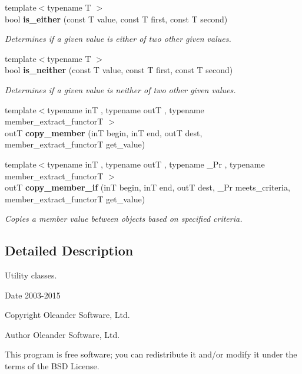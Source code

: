 \begin{DoxyCompactItemize}
\item 
{\footnotesize template$<$typename T $>$ }\\bool {\bf is\+\_\+either} (const T value, const T first, const T second)\label{group___utilities_gac6f2ccd7b99680663d017cf5e0091296}

\begin{DoxyCompactList}\small\item\em Determines if a given value is either of two other given values. \end{DoxyCompactList}\item 
{\footnotesize template$<$typename T $>$ }\\bool {\bf is\+\_\+neither} (const T value, const T first, const T second)\label{group___utilities_ga421fad6362dca9b20bc2fb39b85ea27d}

\begin{DoxyCompactList}\small\item\em Determines if a given value is neither of two other given values. \end{DoxyCompactList}\item 
{\footnotesize template$<$typename inT , typename outT , typename member\+\_\+extract\+\_\+functorT $>$ }\\outT {\bf copy\+\_\+member} (inT begin, inT end, outT dest, member\+\_\+extract\+\_\+functorT get\+\_\+value)
\item 
{\footnotesize template$<$typename inT , typename outT , typename \+\_\+\+Pr , typename member\+\_\+extract\+\_\+functorT $>$ }\\outT {\bf copy\+\_\+member\+\_\+if} (inT begin, inT end, outT dest, \+\_\+\+Pr meets\+\_\+criteria, member\+\_\+extract\+\_\+functorT get\+\_\+value)\label{group___utilities_gad7072d7de4d9be1c1bb94217b7903fa1}

\begin{DoxyCompactList}\small\item\em Copies a member value between objects based on specified criteria. \end{DoxyCompactList}\end{DoxyCompactItemize}


\subsection{Detailed Description}
Utility classes. 

\begin{DoxyDate}{Date}
2003-\/2015 
\end{DoxyDate}
\begin{DoxyCopyright}{Copyright}
Oleander Software, Ltd. 
\end{DoxyCopyright}
\begin{DoxyAuthor}{Author}
Oleander Software, Ltd.
\end{DoxyAuthor}
This program is free software; you can redistribute it and/or modify it under the terms of the B\+SD License. 


